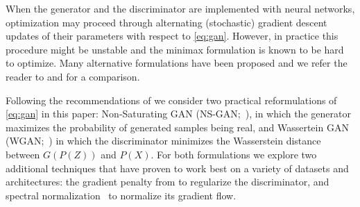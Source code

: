 \documentclass{article}
\begin{document}
When the generator and the discriminator are implemented with neural networks, optimization may proceed through alternating (stochastic) gradient descent updates of their parameters with respect to \eqref{eq:gan}. However, in practice this procedure might be unstable and the minimax formulation is known to be hard to optimize.
Many alternative formulations have been proposed and we refer the reader to \cite{lucic2017gans} and \cite{kurach2018gan} for a comparison.

Following the recommendations of \cite{kurach2018gan} we consider two practical reformulations of \eqref{eq:gan} in this paper: Non-Saturating GAN (NS-GAN;~\cite{goodfellow2014generative}), in which the generator maximizes the probability of generated samples being real, and Wassertein GAN (WGAN;~\cite{arjovsky2017wasserstein}) in which the discriminator minimizes the Wasserstein distance between $G(P(Z))$ and $P(X)$. For both formulations we explore two additional techniques that have proven to work best on a variety of datasets and architectures: the gradient penalty from \cite{gulrajani2017improved} to regularize the discriminator, and spectral normalization~\citep{miyato2018spectral} to normalize its gradient flow.
\end{document}
